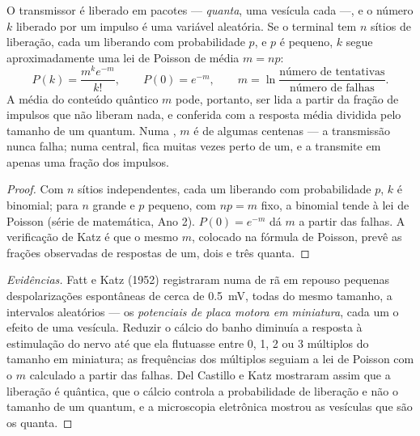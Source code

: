 \begin{theorem}\label{thm:b2:neurons-synapses:quantal}
O transmissor é liberado em pacotes --- \emph{quanta}, uma vesícula cada
---, e o número $k$ liberado por um impulso é uma variável aleatória. Se
o terminal tem $n$ sítios de liberação, cada um liberando com
probabilidade $p$, e $p$ é pequeno, $k$ segue aproximadamente uma lei
de Poisson de média $m = np$:
\[
P(k) = \frac{m^{k}e^{-m}}{k!}, \qquad P(0) = e^{-m}, \qquad
m = \ln\frac{\text{número de tentativas}}{\text{número de falhas}}.
\]
A média do conteúdo quântico $m$ pode, portanto, ser lida a partir da
fração de impulsos que não liberam nada, e conferida com a resposta
média dividida pelo tamanho de um quantum. Numa ,
$m$ é de algumas centenas --- a transmissão nunca falha; numa 
central, fica muitas vezes perto de um, e a  transmite em apenas
uma fração dos impulsos.
\end{theorem}
\begin{proof}
Com $n$ sítios independentes, cada um liberando com probabilidade $p$,
$k$ é binomial; para $n$ grande e $p$ pequeno, com $np = m$ fixo, a
binomial tende à lei de Poisson (série de matemática, Ano 2).
$P(0) = e^{-m}$ dá $m$ a partir das falhas. A verificação de Katz é que
o mesmo $m$, colocado na fórmula de Poisson, prevê as frações observadas
de respostas de um, dois e três quanta.
\end{proof}
\begin{proof}[Evidências]
Fatt e Katz (1952) registraram numa  de rã em repouso
pequenas despolarizações espontâneas de cerca de \qty{0.5}{mV}, todas do
mesmo tamanho, a intervalos aleatórios --- os \emph{potenciais de placa
motora em miniatura}, cada um o efeito de uma vesícula. Reduzir o cálcio
do banho diminuía a resposta à estimulação do nervo até que ela
flutuasse entre 0, 1, 2 ou 3 múltiplos do tamanho em miniatura; as
frequências dos múltiplos seguiam a lei de Poisson com o
$m$ calculado a partir das falhas. Del Castillo e Katz mostraram assim
que a liberação é quântica, que o cálcio controla a probabilidade de
liberação e não o tamanho de um quantum, e a microscopia eletrônica
mostrou as vesículas que são os quanta.
\end{proof}

